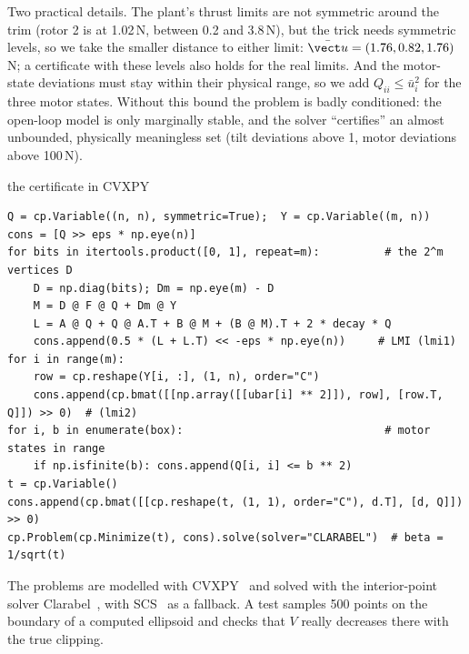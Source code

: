 Two practical details. The plant's thrust limits are not symmetric around the trim (rotor 2 is at 1.02\,N, between 0.2 and 3.8\,N), but the trick needs symmetric levels, so we take the smaller distance to either limit: $\bar{\vect u} = (1.76, 0.82, 1.76)$\,N; a certificate with these levels also holds for the real limits. And the motor-state deviations must stay within their physical range, so we add $Q_{ii}\le\bar u_i^2$ for the three motor states. Without this bound the problem is badly conditioned: the open-loop model is only marginally stable, and the solver ``certifies'' an almost unbounded, physically meaningless set (tilt deviations above 1, motor deviations above 100\,N).

\begin{codebox}{the certificate in CVXPY}
\begin{lstlisting}
Q = cp.Variable((n, n), symmetric=True);  Y = cp.Variable((m, n))
cons = [Q >> eps * np.eye(n)]
for bits in itertools.product([0, 1], repeat=m):          # the 2^m vertices D
    D = np.diag(bits); Dm = np.eye(m) - D
    M = D @ F @ Q + Dm @ Y
    L = A @ Q + Q @ A.T + B @ M + (B @ M).T + 2 * decay * Q
    cons.append(0.5 * (L + L.T) << -eps * np.eye(n))     # LMI (lmi1)
for i in range(m):
    row = cp.reshape(Y[i, :], (1, n), order="C")
    cons.append(cp.bmat([[np.array([[ubar[i] ** 2]]), row], [row.T, Q]]) >> 0)  # (lmi2)
for i, b in enumerate(box):                               # motor states in range
    if np.isfinite(b): cons.append(Q[i, i] <= b ** 2)
t = cp.Variable()
cons.append(cp.bmat([[cp.reshape(t, (1, 1), order="C"), d.T], [d, Q]]) >> 0)
cp.Problem(cp.Minimize(t), cons).solve(solver="CLARABEL")  # beta = 1/sqrt(t)
\end{lstlisting}
\end{codebox}
The problems are modelled with CVXPY~\cite{diamond2016cvxpy} and solved with the interior-point solver Clarabel~\cite{goulart2024clarabel}, with SCS~\cite{odonoghue2016scs} as a fallback. A test samples 500 points on the boundary of a computed ellipsoid and checks that $V$ really decreases there with the true clipping.

